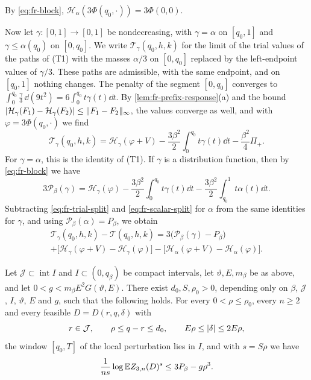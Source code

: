 By \eqref{eq:fr-block}, $\mathcal H_\alpha(3\Phi(q_0,\cdot))=3\Phi(0,0)$.

Now let $\gamma\colon[0,1]\to[0,1]$ be nondecreasing, with $\gamma=\alpha$ on $[q_0,1]$ and $\gamma\le\alpha(q_0)$ on $[0,q_0]$. We write $\mathcal T_\gamma(q_0,h,k)$ for the limit of the trial values of the paths of (T1) with the masses $\alpha/3$ on $[0,q_0]$ replaced by the left-endpoint values of $\gamma/3$. These paths are admissible, with the same endpoint, and on $[q_0,1]$ nothing changes. The penalty of the segment $[0,q_0]$ converges to $\int_0^{q_0}\frac\gamma3\,\dd(9t^2)=6\int_0^{q_0}t\gamma(t)\dd t$. By \cref{lem:fr-prefix-response}(a) and the bound $\lvert \mathcal H_\gamma(F_1)-\mathcal H_\gamma(F_2)\rvert\le\lVert F_1-F_2\rVert_\infty$, the values converge as well, and with $\varphi=3\Phi(q_0,\cdot)$ we find
\begin{equation}\label{eq:fr-trial-split}
 \mathcal T_\gamma(q_0,h,k)=\mathcal H_\gamma(\varphi+V)-\frac{3\beta^2}2\int_0^{q_0}t\gamma(t)\dd t-\frac{\beta^2}4\Pi_+.
\end{equation}
For $\gamma=\alpha$, this is the identity of (T1). If $\gamma$ is a distribution function, then by \eqref{eq:fr-block} we have
\begin{equation}\label{eq:fr-scalar-split}
 3\mathcal P_\beta(\gamma)=\mathcal H_\gamma(\varphi)-\frac{3\beta^2}2\int_0^{q_0}t\gamma(t)\dd t-\frac{3\beta^2}2\int_{q_0}^1t\alpha(t)\dd t.
\end{equation}
Subtracting \eqref{eq:fr-trial-split} and \eqref{eq:fr-scalar-split} for $\alpha$ from the same identities for $\gamma$, and using $\mathcal P_\beta(\alpha)=P_\beta$, we obtain
\begin{multline}\label{eq:fr-trial-difference}
 \mathcal T_\gamma(q_0,h,k)-\mathcal T(q_0,h,k)
 =3\bigl(\mathcal P_\beta(\gamma)-P_\beta\bigr)\\
 +\bigl[\mathcal H_\gamma(\varphi+V)-\mathcal H_\gamma(\varphi)\bigr]-\bigl[\mathcal H_\alpha(\varphi+V)-\mathcal H_\alpha(\varphi)\bigr].
\end{multline}

\begin{lemma}\label{lem:fr-local-gap}
Let $\mathcal J\subset\operatorname{int}I$ and $I\subset(0,q_\beta)$ be compact intervals, let $\vartheta,E,m_\beta$ be as above, and let $0<g<m_\beta E^2G(\vartheta,E)$. There exist $d_0,S,\rho_0>0$, depending only on $\beta$, $\mathcal J$, $I$, $\vartheta$, $E$ and $g$, such that the following holds. For every $0<\rho\le\rho_0$, every $n\ge2$ and every feasible $D=D(r,q,\delta)$ with
\[
 r\in\mathcal J,\qquad\rho\le q-r\le d_0,\qquad E\rho\le\lvert \delta\rvert\le2E\rho,
\]
the window $[q_0,T]$ of the local perturbation lies in $I$, and with $s=S\rho$ we have
\begin{equation}\label{b:eq:local-fractional-gap}
 \frac1{ns}\log\mathbb E Z_{3,n}(D)^s\le3P_\beta-g\rho^3.
\end{equation}
\end{lemma}

